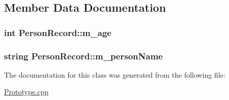 \subsection{Member Data Documentation}
\subsubsection[{\texorpdfstring{m\+\_\+age}{m_age}}]{\setlength{\rightskip}{0pt plus 5cm}int Person\+Record\+::m\+\_\+age\hspace{0.3cm}{\ttfamily [private]}}\hypertarget{classPersonRecord_a5c3c3ed331d3b814e67922d0f4c0a13f}{}\label{classPersonRecord_a5c3c3ed331d3b814e67922d0f4c0a13f}
\subsubsection[{\texorpdfstring{m\+\_\+person\+Name}{m_personName}}]{\setlength{\rightskip}{0pt plus 5cm}string Person\+Record\+::m\+\_\+person\+Name\hspace{0.3cm}{\ttfamily [private]}}\hypertarget{classPersonRecord_af9c4e5c960723d9da2a1fd48c54d2404}{}\label{classPersonRecord_af9c4e5c960723d9da2a1fd48c54d2404}


The documentation for this class was generated from the following file\+:\begin{DoxyCompactItemize}
\item 
\hyperlink{Prototype_8cpp}{Prototype.\+cpp}\end{DoxyCompactItemize}

